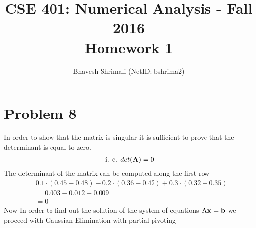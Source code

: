 \documentclass[11pt]{article}
\title{\bf CSE 401: Numerical Analysis - Fall 2016 \\ Homework 1}
\author{Bhavesh Shrimali (NetID: bshrima2)}
\begin{document}
\maketitle
\section*{Problem 8}
\noindent 
In order to show that the matrix is singular it is sufficient to prove that the determinant is equal to zero.
\begin{align}
\text{ i. e. }
det({\bf A}) = 0
\end{align}
The determinant of the matrix can be computed along the first row
\begin{align*}
& 0.1 \cdot (0.45-0.48) - 0.2 \cdot (0.36-0.42) + 0.3 \cdot (0.32-0.35)\\
 & = 0.003  - 0.012 + 0.009\\
 & = 0  
\end{align*}
Now In order to find out the solution of the system of equations ${\bf Ax = b}$ we proceed with Gaussian-Elimination with partial pivoting
\end{document}
